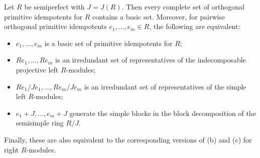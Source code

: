 Let $R$ be semiperfect with $J = J(R)$. Then every complete set of orthogonal primitive idempotents for $R$ contains a basic set. Moreover, for pairwise orthogonal primitive idempotents $e_1, \ldots, e_m \in R$, the following are equivalent:
\begin{itemize}
\item[(a)] $e_1, \ldots, e_m$ is a basic set of primitive idempotents for $R$;
\item[(b)] $R e_1, \ldots, R e_m$ is an irredundant set of representatives of the indecomposable projective left $R$-modules;
\item[(c)] $R e_1/J e_1, \ldots, R e_m/J e_m$ is an irredundant set of representatives of the simple left $R$-modules;
\item[(d)] $e_1 + J, \ldots, e_m + J$ generate the simple blocks in the block decomposition of the semisimple ring $R/J$.
\end{itemize}
Finally, these are also equivalent to the corresponding versions of (b) and (c) for right $R$-modules.
